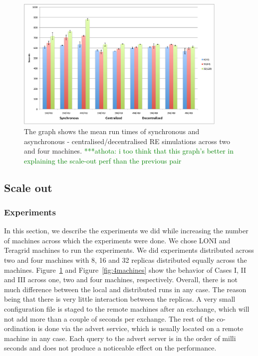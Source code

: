 \documentclass{rspublic}
\newcommand{\athotanote}[1]{ {\textcolor{green} { ***athota: #1 }}}
\newcommand{\athotanote}[1]{}
\begin{document}
%
\begin{figure}
\centering
\includegraphics[width=0.9\textwidth]{../data/scaleout.pdf}
\caption{\small The graph shows the mean run times of synchronous and
  asynchronous - centralised/decentralised RE simulations across two
  and four machines.\athotanote{i too think that this graph's better
    in explaining the scale-out perf than the previous pair} }
\label{fig:2machines}
\vspace{-1em}
\end{figure}

\subsection{Scale out}
\subsubsection{Experiments}
In this section, we describe the experiments we did while increasing the number of machines across which the experiments were done. We chose LONI and Teragrid machines to run the experiments. We did experiments distributed across two and four machines with 8, 16 and 32 replicas distributed equally across the machines. 
Figure~\ref{fig:2machines} and Figure~\ref{fig:4machines} show the behavior of Cases I, II and III across one, two and four machines, respectively. Overall, there is not much difference between the local and distributed runs in any case. The reason being that there is very little interaction between the replicas. A very small configuration file is staged to the remote machines after an exchange, which will not add more than a couple of seconds per exchange. The rest of the co-ordination is done via the advert service, which is usually located on a remote machine in any case. Each query to the advert server is in the order of milli seconds and does not produce a noticeable effect on the performance. 
\end{document}
